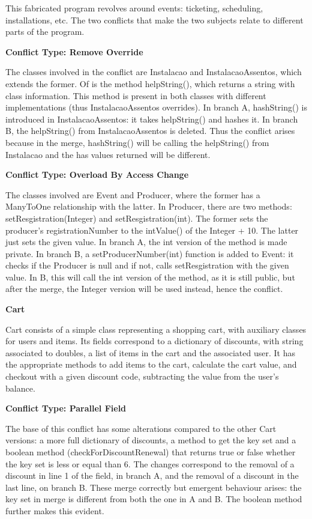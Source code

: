 This fabricated program revolves around events: ticketing, scheduling, installations, etc. The two
conflicts that make the two subjects relate to different parts of the program.

\textbf{Conflict Type: Remove Override}

The classes involved in the conflict are Instalacao and InstalacaoAssentos, which extends the former.
Of is the method helpString(), which returns a string with class information. This method is present
in both classes with different implementations (thus InstalacaoAssentos overrides). In branch A,
hashString() is introduced in InstalacaoAssentos: it takes helpString() and hashes it. In branch B,
the helpString() from InstalacaoAssentos is deleted. Thus the conflict arises because in the merge,
hashString() will be  calling the helpString() from Instalacao and the has values returned will be different.

\textbf{Conflict Type: Overload By Access Change}

The classes involved are Event and Producer, where the former has a ManyToOne relationship with the latter.
In Producer, there are two methods: setResgistration(Integer) and setResgistration(int). The former sets
the producer's registrationNumber to the intValue() of the Integer + 10. The latter just sets the given value.
In branch A, the int version of the method is made private. In branch B, a setProducerNumber(int) function is added
to Event: it checks if the Producer is null and if not, calls setResgistration with the given value. In B, this will
call the int version of the method, as it is still public, but after the merge, the Integer version will be used instead,
hence the conflict.

\textbf{Cart}

Cart consists of a simple class representing a shopping cart, with auxiliary classes for users and items.
Its fields correspond to a dictionary of discounts, with string associated to doubles, a list of items in the cart
and the associated user.
It has the appropriate methods to add items to the cart, calculate the cart value, and checkout with a given discount code,
subtracting the value from the user's balance.

\textbf{Conflict Type: Parallel Field}

The base of this conflict has some alterations compared to the other Cart versions: a more full dictionary of discounts,
a method to get the key set and a boolean method (checkForDiscountRenewal) that returns true or false whether the key set is less or equal than 6.
The changes correspond to the removal of a discount in line 1 of the field, in branch A, and the removal of a discount in the last line, on branch B.
These merge correctly but emergent behaviour arises: the key set in merge is different from both the one in A and B.
The boolean method further makes this evident.

